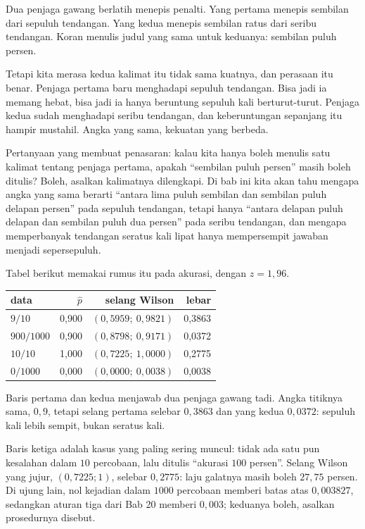 \begin{untukanak}
Dua penjaga gawang berlatih menepis penalti. Yang pertama menepis sembilan dari sepuluh
tendangan. Yang kedua menepis sembilan ratus dari seribu tendangan. Koran menulis judul
yang sama untuk keduanya: sembilan puluh persen.

Tetapi kita merasa kedua kalimat itu tidak sama kuatnya, dan perasaan itu benar. Penjaga
pertama baru menghadapi sepuluh tendangan. Bisa jadi ia memang hebat, bisa jadi ia hanya
beruntung sepuluh kali berturut-turut. Penjaga kedua sudah menghadapi seribu tendangan,
dan keberuntungan sepanjang itu hampir mustahil. Angka yang sama, kekuatan yang berbeda.

Pertanyaan yang membuat penasaran: kalau kita hanya boleh menulis satu kalimat tentang
penjaga pertama, apakah ``sembilan puluh persen'' masih boleh ditulis? Boleh, asalkan
kalimatnya dilengkapi. Di bab ini kita akan tahu mengapa angka yang sama berarti ``antara
lima puluh sembilan dan sembilan puluh delapan persen'' pada sepuluh tendangan, tetapi
hanya ``antara delapan puluh delapan dan sembilan puluh dua persen'' pada seribu tendangan,
dan mengapa memperbanyak tendangan seratus kali lipat hanya mempersempit jawaban menjadi
sepersepuluh.
\end{untukanak}

Tabel berikut memakai rumus itu pada akurasi, dengan $z=1{,}96$.

\begin{center}
\small
\begin{tabular}{lrrr}
\hline
data & $\hat p$ & selang Wilson & lebar \\
\hline
$9/10$ & 0,900 & $(0{,}5959;\ 0{,}9821)$ & 0,3863 \\
$900/1000$ & 0,900 & $(0{,}8798;\ 0{,}9171)$ & 0,0372 \\
$10/10$ & 1,000 & $(0{,}7225;\ 1{,}0000)$ & 0,2775 \\
$0/1000$ & 0,000 & $(0{,}0000;\ 0{,}0038)$ & 0,0038 \\
\hline
\end{tabular}
\end{center}

Baris pertama dan kedua menjawab dua penjaga gawang tadi. Angka titiknya
sama, $0{,}9$, tetapi selang pertama selebar $0{,}3863$ dan yang kedua $0{,}0372$:
sepuluh kali lebih sempit, bukan seratus kali.

Baris ketiga adalah kasus yang paling sering muncul: tidak ada satu pun kesalahan
dalam $10$ percobaan, lalu ditulis ``akurasi $100$ persen''. Selang Wilson yang
jujur, $(0{,}7225;1)$, selebar $0{,}2775$: laju galatnya masih boleh $27{,}75$
persen. Di ujung lain, nol kejadian dalam $1000$ percobaan memberi batas atas
$0{,}003827$, sedangkan aturan tiga dari Bab 20 memberi $0{,}003$; keduanya boleh,
asalkan prosedurnya disebut.

